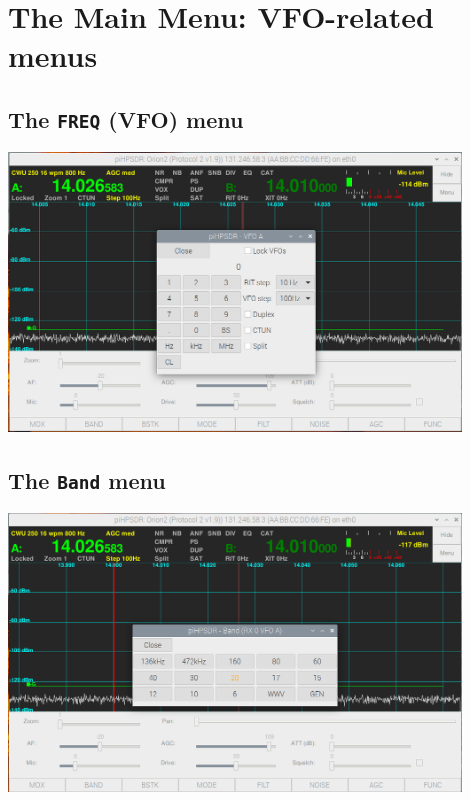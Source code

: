 \documentclass[12pt]{book}
\begin{document}
\chapter{The Main Menu: VFO-related menus}

\section{The \texttt{FREQ} (VFO) menu}
\begin{center}
\includegraphics[width=12cm]{VFOmenu.png}
\end{center}

\section{The \texttt{Band} menu}
\begin{center}
\includegraphics[width=12cm]{BandMenu.png}
\end{center}
\end{document}
